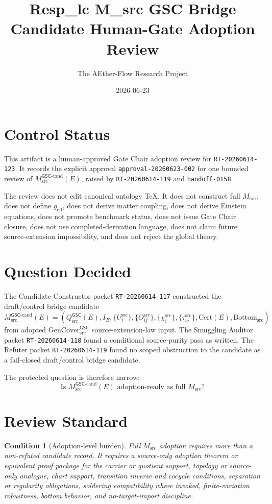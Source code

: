 \documentclass[11pt]{article}
\title{Resp\_lc M\_src GSC Bridge Candidate Human-Gate Adoption Review}
\author{The AEther-Flow Research Project}
\date{2026-06-23}
\newcommand{\GSC}{\mathsf{GSC}}
\newcommand{\Msrc}{M_{\mathrm{src}}}
\newcommand{\Mgsccand}{M_{\mathrm{src}}^{\GSC\mbox{-}\mathrm{cand}}}
\newcommand{\Qsrc}{Q_{\mathrm{src}}^{\GSC}}
\newcommand{\Bottomsrc}{\mathrm{Bottom}_{\mathrm{src}}}
\newcommand{\GenCover}{\mathrm{GenCover}_{\mathrm{src}}^{\GSC}}
\newcommand{\geff}{g_{\mathrm{eff}}}
\newtheorem{condition}{Condition}
\begin{document}
\maketitle

\section*{Control Status}

This artifact is a human-approved Gate Chair adoption review for
\texttt{RT-20260614-123}. It records the explicit approval
\texttt{approval-20260623-002} for one bounded review of
\(\Mgsccand(E)\), raised by \texttt{RT-20260614-119} and
\texttt{handoff-0158}.

The review does not edit canonical ontology TeX. It does not construct full
\(\Msrc\), does not define \(\geff\), does not derive matter coupling, does
not derive Einstein equations, does not promote benchmark status, does not
issue Gate Chair closure, does not use completed-derivation language, does
not claim future source-extension impossibility, and does not reject the
global theory.

\section{Question Decided}

The Candidate Constructor packet \texttt{RT-20260614-117} constructed the
draft/control bridge candidate
\[
  \Mgsccand(E)=
  \left(
  \Qsrc(E),
  I_E,
  \{U_i^{\mathrm{src}}\},
  \{O_{ij}^{\mathrm{src}}\},
  \{\chi_i^{\mathrm{src}}\},
  \{\tau_{ij}^{\mathrm{src}}\},
  \mathrm{Cert}(E),
  \Bottomsrc
  \right)
\]
from adopted \(\GenCover\) source-extension-law input. The Smuggling Auditor
packet \texttt{RT-20260614-118} found a conditional source-purity pass as
written. The Refuter packet \texttt{RT-20260614-119} found no scoped
obstruction to the candidate as a fail-closed draft/control bridge candidate.

The protected question is therefore narrow:
\[
\text{Is }\Mgsccand(E)\text{ adoption-ready as full }\Msrc\text{?}
\]

\section{Review Standard}

\begin{condition}[Adoption-level burden]
Full \(\Msrc\) adoption requires more than a non-refuted candidate record. It
requires a source-only adoption theorem or equivalent proof package for the
carrier or quotient support, topology or source-only analogue, chart support,
transition inverse and cocycle conditions, separation or regularity
obligations, soldering compatibility where invoked, finite-variation
robustness, bottom behavior, and no-target-import discipline.
\end{condition}
\end{document}
